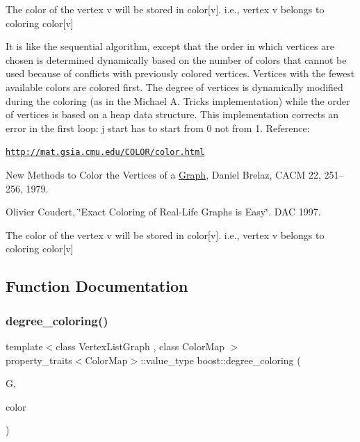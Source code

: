 The color of the vertex v will be stored in color\mbox{[}v\mbox{]}. i.\+e., vertex v belongs to coloring color\mbox{[}v\mbox{]}

It is like the sequential algorithm, except that the order in which vertices are chosen is determined dynamically based on the number of colors that cannot be used because of conflicts with previously colored vertices. Vertices with the fewest available colors are colored first. The degree of vertices is dynamically modified during the coloring (as in the Michael A. Trick\textquotesingle{}s implementation) while the order of vertices is based on a heap data structure. This implementation corrects an error in the first loop\+: j start has to start from 0 not from 1. Reference\+:
\begin{DoxyItemize}
\item \href{http://mat.gsia.cmu.edu/COLOR/color.html}{\tt http\+://mat.\+gsia.\+cmu.\+edu/\+C\+O\+L\+O\+R/color.\+html}
\item New Methods to Color the Vertices of a \hyperlink{structGraph}{Graph}, Daniel Brelaz, C\+A\+CM 22, 251--256, 1979.
\item Olivier Coudert, \char`\"{}\+Exact Coloring of Real-\/\+Life Graphs is Easy\char`\"{}. D\+AC 1997.
\end{DoxyItemize}

The color of the vertex v will be stored in color\mbox{[}v\mbox{]}. i.\+e., vertex v belongs to coloring color\mbox{[}v\mbox{]} 

\subsection{Function Documentation}
\mbox{\label{namespaceboost_a78c0b54ba26e1079abb19d6cca78c8e8}} 
\subsubsection{\texorpdfstring{degree\+\_\+coloring()}{degree\_coloring()}}
{\footnotesize\ttfamily template$<$class Vertex\+List\+Graph , class Color\+Map $>$ \\
property\+\_\+traits$<$Color\+Map$>$\+::value\+\_\+type boost\+::degree\+\_\+coloring (\begin{DoxyParamCaption}\item[{const Vertex\+List\+Graph \&}]{G,  }\item[{Color\+Map}]{color }\end{DoxyParamCaption})}



